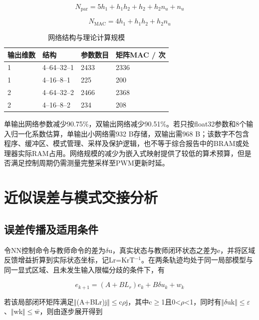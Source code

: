 \documentclass[UTF8,fontset=fandol,a4paper,twocolumn,10pt]{ctexart}
\begin{document}
\begin{equation}N_{\mathrm{par}}=5h_1+h_1h_2+h_2+h_2n_u+n_u\label{eq:30}\end{equation}

\begin{equation}N_{\mathrm{MAC}}=4h_1+h_1h_2+h_2n_u\label{eq:31}\end{equation}

\begin{table}[!htbp]\centering\caption{网络结构与理论计算规模}\label{tab:3}\small\setlength{\tabcolsep}{3pt}
\begin{tabularx}{\columnwidth}{YYYY}\toprule
\textbf{输出维数} & \textbf{结构} & \textbf{参数数目} & \textbf{矩阵MAC / 次}\\ & 4–64–32–1 & 2433 & 2336\\
1 & 4–16–8–1 & 225 & 200\\
2 & 4–64–32–2 & 2466 & 2368\\
2 & 4–16–8–2 & 234 & 208\\
\bottomrule\end{tabularx}
\end{table}

单输出网络参数减少90.75\%，双输出网络减少90.51\%。若只按float32参数和8个输入归一化系数估算，单输出小网络需932 B存储，双输出需968 B；该数字不包含程序、缓冲区、模式管理、采样及保护逻辑，也不等于综合报告中的BRAM或处理器实际RAM占用。网络规模的减少为嵌入式映射提供了较低的算术预算，但是否满足控制周期仍需测量完整采样至PWM更新时延。


\section{近似误差与模式交接分析}


\subsection{误差传播及适用条件}

令NN控制命令与教师命令的差为$\delta$u，真实状态与教师闭环状态之差为e，并将区域反馈增益折算到实际状态坐标，记Lr=KrT$^{-1}$。在两条轨迹均处于同一局部模型与同一显式区域、且未发生输入限幅分歧的条件下，有

\begin{equation}e_{k+1}=(A+BL_r)e_k+B\delta u_k+w_k\label{eq:32}\end{equation}

若该局部闭环矩阵满足$\Vert$(A+BLr)j$\Vert$$\le$c$\rho$j，其中c$\ge$1且0<$\rho$<1，同时有$\Vert$$\delta$uk$\Vert$$\le$$\varepsilon$、$\Vert$wk$\Vert$$\le$w̄，则由逐步展开得到
\end{document}
